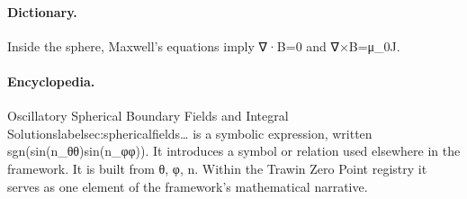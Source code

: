 \paragraph{Dictionary.}
Inside the sphere, Maxwell's equations imply ∇·B=0 and ∇×B=μ\_0J.

\paragraph{Encyclopedia.}
Oscillatory Spherical Boundary Fields and Integral Solutionslabelsec:sphericalfields… is a symbolic expression, written sgn(sin(n\_θθ)sin(n\_φφ)). It introduces a symbol or relation used elsewhere in the framework. It is built from θ, φ, n. Within the Trawin Zero Point registry it serves as one element of the framework's mathematical narrative.

